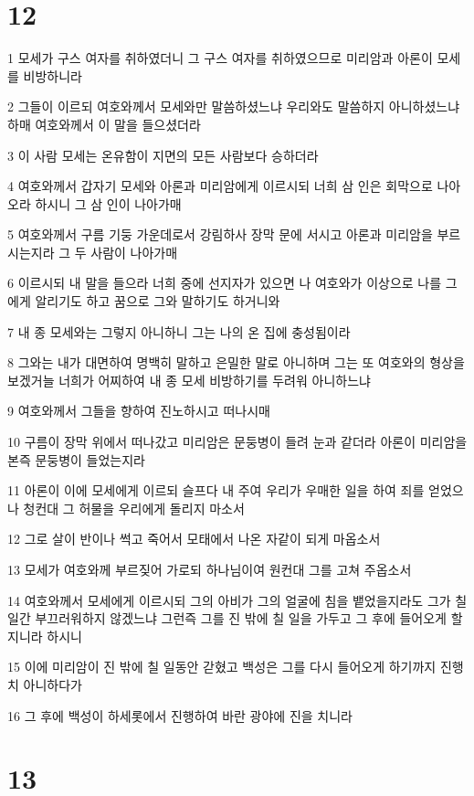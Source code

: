 \chapter{12}

\par 1 모세가 구스 여자를 취하였더니 그 구스 여자를 취하였으므로 미리암과 아론이 모세를 비방하니라
\par 2 그들이 이르되 여호와께서 모세와만 말씀하셨느냐 우리와도 말씀하지 아니하셨느냐 하매 여호와께서 이 말을 들으셨더라
\par 3 이 사람 모세는 온유함이 지면의 모든 사람보다 승하더라
\par 4 여호와께서 갑자기 모세와 아론과 미리암에게 이르시되 너희 삼 인은 회막으로 나아오라 하시니 그 삼 인이 나아가매
\par 5 여호와께서 구름 기둥 가운데로서 강림하사 장막 문에 서시고 아론과 미리암을 부르시는지라 그 두 사람이 나아가매
\par 6 이르시되 내 말을 들으라 너희 중에 선지자가 있으면 나 여호와가 이상으로 나를 그에게 알리기도 하고 꿈으로 그와 말하기도 하거니와
\par 7 내 종 모세와는 그렇지 아니하니 그는 나의 온 집에 충성됨이라
\par 8 그와는 내가 대면하여 명백히 말하고 은밀한 말로 아니하며 그는 또 여호와의 형상을 보겠거늘 너희가 어찌하여 내 종 모세 비방하기를 두려워 아니하느냐
\par 9 여호와께서 그들을 향하여 진노하시고 떠나시매
\par 10 구름이 장막 위에서 떠나갔고 미리암은 문둥병이 들려 눈과 같더라 아론이 미리암을 본즉 문둥병이 들었는지라
\par 11 아론이 이에 모세에게 이르되 슬프다 내 주여 우리가 우매한 일을 하여 죄를 얻었으나 청컨대 그 허물을 우리에게 돌리지 마소서
\par 12 그로 살이 반이나 썩고 죽어서 모태에서 나온 자같이 되게 마옵소서
\par 13 모세가 여호와께 부르짖어 가로되 하나님이여 원컨대 그를 고쳐 주옵소서
\par 14 여호와께서 모세에게 이르시되 그의 아비가 그의 얼굴에 침을 뱉었을지라도 그가 칠 일간 부끄러워하지 않겠느냐 그런즉 그를 진 밖에 칠 일을 가두고 그 후에 들어오게 할지니라 하시니
\par 15 이에 미리암이 진 밖에 칠 일동안 갇혔고 백성은 그를 다시 들어오게 하기까지 진행치 아니하다가
\par 16 그 후에 백성이 하세롯에서 진행하여 바란 광야에 진을 치니라

\chapter{13}

